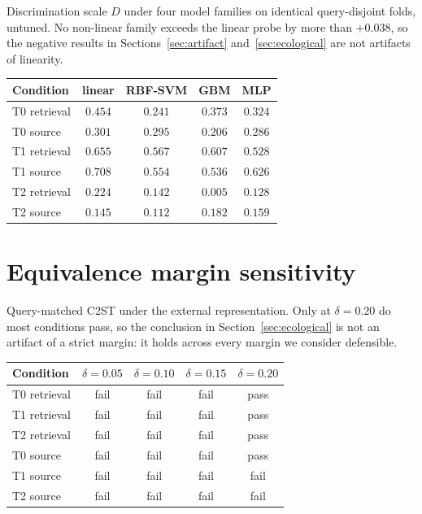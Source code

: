 \documentclass{article}
\begin{document}
Discrimination scale $D$ under four model families on identical query-disjoint folds, untuned.
No non-linear family exceeds the linear probe by more than $+0.038$, so the negative results in
Sections~\ref{sec:artifact} and~\ref{sec:ecological} are not artifacts of linearity.

\begin{center}
\small
\begin{tabular}{@{}lcccc@{}}
\toprule
Condition & linear & RBF-SVM & GBM & MLP \\
\midrule
T0 retrieval & $0.454$ & $0.241$ & $0.373$ & $0.324$ \\
T0 source    & $0.301$ & $0.295$ & $0.206$ & $0.286$ \\
T1 retrieval & $0.655$ & $0.567$ & $0.607$ & $0.528$ \\
T1 source    & $0.708$ & $0.554$ & $0.536$ & $0.626$ \\
T2 retrieval & $0.224$ & $0.142$ & $0.005$ & $0.128$ \\
T2 source    & $0.145$ & $0.112$ & $0.182$ & $0.159$ \\
\bottomrule
\end{tabular}
\end{center}

\section{Equivalence margin sensitivity}
\label{app:delta}

Query-matched C2ST under the external representation. Only at $\delta = 0.20$ do most
conditions pass, so the conclusion in Section~\ref{sec:ecological} is not an artifact of a
strict margin: it holds across every margin we consider defensible.

\begin{center}
\small
\begin{tabular}{@{}lcccc@{}}
\toprule
Condition & $\delta{=}0.05$ & $\delta{=}0.10$ & $\delta{=}0.15$ & $\delta{=}0.20$ \\
\midrule
T0 retrieval & fail & fail & fail & pass \\
T1 retrieval & fail & fail & fail & pass \\
T2 retrieval & fail & fail & fail & pass \\
T0 source    & fail & fail & fail & pass \\
T1 source    & fail & fail & fail & fail \\
T2 source    & fail & fail & fail & fail \\
\bottomrule
\end{tabular}
\end{center}
\end{document}
